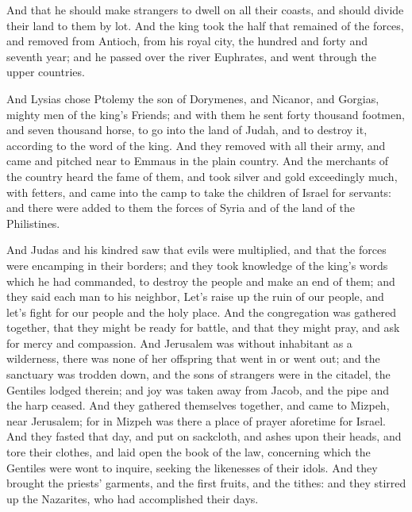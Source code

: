 {And that he should make strangers to dwell on all their coasts, and should divide their land to them by lot.
And the king took the half that remained of the forces, and removed from Antioch, from his royal city,
 the hundred and forty and seventh year; and he passed over the river Euphrates, and went through the upper countries.
\par }{\PP {}And Lysias chose Ptolemy the son of Dorymenes, and Nicanor, and Gorgias, mighty men of the king’s
 Friends;
and with them he sent forty thousand footmen, and seven thousand horse, to go into the land of Judah, and to destroy it, according to the word of the king.
And they removed with all their army, and came and pitched near to Emmaus in the plain country.
And the merchants of the country heard the fame of them, and took silver and gold exceedingly much, with
 fetters, and came into the camp to take the children of Israel for servants: and there were added to them the forces of Syria and of the land of the
 Philistines.
\par }{\PP {}And Judas and his kindred saw that evils were multiplied, and that the forces were encamping in their borders; and they took knowledge of the king’s words which he had commanded, to destroy the people and make an end of them;
and they said each man to his neighbor, Let’s raise up the ruin of our people, and let’s fight for our people and the holy place.
And the congregation was gathered together, that they might be ready for battle, and that they might pray, and ask for mercy and compassion.
And Jerusalem was without inhabitant as a wilderness, there was none of her offspring that went in or went out; and the sanctuary was trodden down, and the sons of strangers were in the citadel, the Gentiles lodged therein; and joy was taken away from Jacob, and the pipe and the harp ceased.
And they gathered themselves together, and came to Mizpeh, near Jerusalem; for in Mizpeh was there a place of prayer aforetime for Israel.
And they fasted that day, and put on sackcloth, and
{} ashes upon their heads, and tore their clothes,
and laid open the book of the law, concerning which the Gentiles were wont to inquire, seeking the likenesses of their idols.
And they brought the priests’ garments, and the first fruits, and the tithes: and they stirred up the Nazarites, who had accomplished their days.
}
